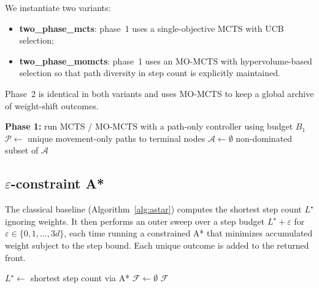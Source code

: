 We instantiate two variants:
\begin{itemize}
    \item \textbf{two\_phase\_mcts}: phase~1 uses a single-objective MCTS with UCB selection;
    \item \textbf{two\_phase\_momcts}: phase~1 uses an MO-MCTS with hypervolume-based selection so that path diversity in step count is explicitly maintained.
\end{itemize}
Phase~2 is identical in both variants and uses MO-MCTS to keep a global archive of weight-shift outcomes.

\begin{algorithm}[h]
\SetAlgoLined
{}
\textbf{Phase 1:} run MCTS / MO-MCTS with a path-only controller using budget $B_1$\;
$\mathcal{P} \leftarrow$ unique movement-only paths to terminal nodes\;
$\mathcal{A} \leftarrow \emptyset$\;
\Return non-dominated subset of $\mathcal{A}$\;
\caption{Two-Phase (MO-)MCTS}
\label{alg:tp}
\end{algorithm}

\newpage
\subsection{$\varepsilon$-constraint A*}
\label{sec:astar}
The classical baseline (Algorithm~\ref{alg:astar}) computes the shortest step count $L^{\star}$ ignoring weights. It then performs an outer sweep over a step budget $L^{\star} + \varepsilon$ for $\varepsilon \in \{0, 1, \dots, 3d\}$, each time running a constrained A* that minimizes accumulated weight subject to the step bound. Each unique outcome is added to the returned front.

\begin{algorithm}[h]
\SetAlgoLined
{}
$L^{\star} \leftarrow$ shortest step count via A*\;
$\mathcal{F} \leftarrow \emptyset$\;
\Return $\mathcal{F}$\;
\caption{$\varepsilon$-constraint A* baseline}
\label{alg:astar}
\end{algorithm}


